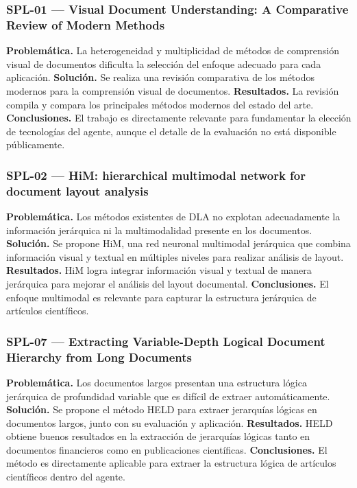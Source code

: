 \subsubsection*{SPL-01 --- Visual Document Understanding: A Comparative Review of Modern Methods \cite{ref23}}

\textbf{Problemática.} La heterogeneidad y multiplicidad de métodos de comprensión visual de documentos dificulta la selección del enfoque adecuado para cada aplicación. \textbf{Solución.} Se realiza una revisión comparativa de los métodos modernos para la comprensión visual de documentos. \textbf{Resultados.} La revisión compila y compara los principales métodos modernos del estado del arte. \textbf{Conclusiones.} El trabajo es directamente relevante para fundamentar la elección de tecnologías del agente, aunque el detalle de la evaluación no está disponible públicamente.

\subsubsection*{SPL-02 --- HiM: hierarchical multimodal network for document layout analysis \cite{ref24}}

\textbf{Problemática.} Los métodos existentes de DLA no explotan adecuadamente la información jerárquica ni la multimodalidad presente en los documentos. \textbf{Solución.} Se propone HiM, una red neuronal multimodal jerárquica que combina información visual y textual en múltiples niveles para realizar análisis de layout. \textbf{Resultados.} HiM logra integrar información visual y textual de manera jerárquica para mejorar el análisis del layout documental. \textbf{Conclusiones.} El enfoque multimodal es relevante para capturar la estructura jerárquica de artículos científicos.

\subsubsection*{SPL-07 --- Extracting Variable-Depth Logical Document Hierarchy from Long Documents \cite{ref25}}

\textbf{Problemática.} Los documentos largos presentan una estructura lógica jerárquica de profundidad variable que es difícil de extraer automáticamente. \textbf{Solución.} Se propone el método HELD para extraer jerarquías lógicas en documentos largos, junto con su evaluación y aplicación. \textbf{Resultados.} HELD obtiene buenos resultados en la extracción de jerarquías lógicas tanto en documentos financieros como en publicaciones científicas. \textbf{Conclusiones.} El método es directamente aplicable para extraer la estructura lógica de artículos científicos dentro del agente.

